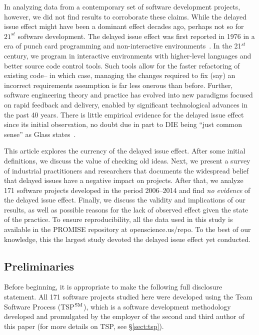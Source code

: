 \documentclass[smallcondensed]{svjour3}
\newcommand{\tion}[1]{\S\ref{sect:#1}}
\begin{document}
In analyzing data from a contemporary set of software development projects, however, we did not find results to corroborate these claims. While the delayed issue effect might have been a dominant
effect decades ago, perhaps not so for $21^{\mathit{st}}$
software development. 
 The delayed issue effect was first reported in 1976 in a era of punch card programming
and non-interactive environments~\cite{Boehm76}. In the 21$^\mathit{st}$ century, we  program in 
interactive environments with higher-level languages and better source code control
tools. Such tools allow for the faster refactoring of existing
code-- in which case, 
managing the changes required to fix (say) an incorrect requirements assumption
is far less    onerous    than before. Further, software engineering theory and practice has evolved into new paradigms focused on rapid feedback and delivery, enabled by significant technological advances in the past 40 years. There is little empirical evidence for the delayed issue effect since its initial observation, no doubt due in part to DIE being ``just common sense'' as Glass states~\cite{glass02}. 

This article explores the currency of the delayed issue effect.
After some initial definitions, we discuss the
value of checking old ideas. Next, we present a survey of industrial practitioners and researchers that documents the widespread belief that delayed issues have a negative impact on projects.  After that, we  analyze 171 software  projects developed in the period 2006--2014 and find  {\em no evidence} of the delayed issue effect. Finally, we discuss the validity and implications of our results, as well as possible reasons for the lack of observed effect given the state of the practice. To ensure reproducibility,
all the data  used in this study is available in the PROMISE
repository at openscience.us/repo. 
To the best of our knowledge,
this the largest study devoted the delayed issue effect yet conducted.




\subsection{Preliminaries}\label{sect:nontsp}
Before beginning, it is appropriate to make the following full disclosure statement. 
All 171 software projects
studied here were developed using the Team Software Process (TSP$\textsuperscript{SM}$), which is a software development methodology
developed and promulgated by the employer of the second and third author of this paper (for more details on TSP,
 see \tion{tsp}).
\end{document}
